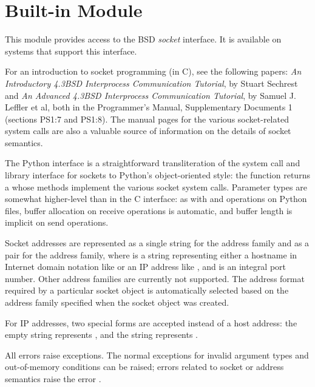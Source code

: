 \section{Built-in Module }
\label{module-socket}

This module provides access to the BSD {\em socket} interface.
It is available on \UNIX{} systems that support this interface.

For an introduction to socket programming (in C), see the following
papers: \emph{An Introductory 4.3BSD Interprocess Communication
Tutorial}, by Stuart Sechrest and \emph{An Advanced 4.3BSD Interprocess
Communication Tutorial}, by Samuel J.  Leffler et al, both in the
\UNIX{} Programmer's Manual, Supplementary Documents 1 (sections PS1:7
and PS1:8).  The \UNIX{} manual pages for the various socket-related
system calls are also a valuable source of information on the details of
socket semantics.

The Python interface is a straightforward transliteration of the
\UNIX{} system call and library interface for sockets to Python's
object-oriented style: the  function returns a
 whose methods implement the various socket system
calls.  Parameter types are somewhat higher-level than in the C
interface: as with  and  operations on Python
files, buffer allocation on receive operations is automatic, and
buffer length is implicit on send operations.

Socket addresses are represented as a single string for the
 address family and as a pair
 for the  address family,
where  is a string representing
either a hostname in Internet domain notation like
 or an IP address like ,
and  is an integral port number.  Other address families are
currently not supported.  The address format required by a particular
socket object is automatically selected based on the address family
specified when the socket object was created.

For IP addresses, two special forms are accepted instead of a host
address: the empty string represents , and the string
 represents .

All errors raise exceptions.  The normal exceptions for invalid
argument types and out-of-memory conditions can be raised; errors
related to socket or address semantics raise the error .

